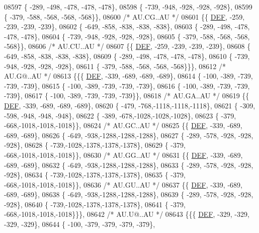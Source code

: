 \begin{DoxyCode}
08597 \{ -289, -498, -478, -478, -478\},
08598 \{ -739, -948, -928, -928, -928\},
08599 \{ -379, -588, -568, -568, -568\}\},
08600 \textcolor{comment}{/* AU.CG..AU */}
08601 \{\{  \mbox{\hyperlink{1_88_84__epars_8h_a397419fc12b37ed479c8abb9d444d843}{DEF}}, -259, -239, -239, -239\},
08602 \{ -649, -858, -838, -838, -838\},
08603 \{ -289, -498, -478, -478, -478\},
08604 \{ -739, -948, -928, -928, -928\},
08605 \{ -379, -588, -568, -568, -568\}\},
08606 \textcolor{comment}{/* AU.CU..AU */}
08607 \{\{  \mbox{\hyperlink{1_88_84__epars_8h_a397419fc12b37ed479c8abb9d444d843}{DEF}}, -259, -239, -239, -239\},
08608 \{ -649, -858, -838, -838, -838\},
08609 \{ -289, -498, -478, -478, -478\},
08610 \{ -739, -948, -928, -928, -928\},
08611 \{ -379, -588, -568, -568, -568\}\}\},
08612 \textcolor{comment}{/* AU.G@..AU */}
08613 \{\{\{  \mbox{\hyperlink{1_88_84__epars_8h_a397419fc12b37ed479c8abb9d444d843}{DEF}}, -339, -689, -689, -689\},
08614 \{ -100, -389, -739, -739, -739\},
08615 \{ -100, -389, -739, -739, -739\},
08616 \{ -100, -389, -739, -739, -739\},
08617 \{ -100, -389, -739, -739, -739\}\},
08618 \textcolor{comment}{/* AU.GA..AU */}
08619 \{\{  \mbox{\hyperlink{1_88_84__epars_8h_a397419fc12b37ed479c8abb9d444d843}{DEF}}, -339, -689, -689, -689\},
08620 \{ -479, -768,-1118,-1118,-1118\},
08621 \{ -309, -598, -948, -948, -948\},
08622 \{ -389, -678,-1028,-1028,-1028\},
08623 \{ -379, -668,-1018,-1018,-1018\}\},
08624 \textcolor{comment}{/* AU.GC..AU */}
08625 \{\{  \mbox{\hyperlink{1_88_84__epars_8h_a397419fc12b37ed479c8abb9d444d843}{DEF}}, -339, -689, -689, -689\},
08626 \{ -649, -938,-1288,-1288,-1288\},
08627 \{ -289, -578, -928, -928, -928\},
08628 \{ -739,-1028,-1378,-1378,-1378\},
08629 \{ -379, -668,-1018,-1018,-1018\}\},
08630 \textcolor{comment}{/* AU.GG..AU */}
08631 \{\{  \mbox{\hyperlink{1_88_84__epars_8h_a397419fc12b37ed479c8abb9d444d843}{DEF}}, -339, -689, -689, -689\},
08632 \{ -649, -938,-1288,-1288,-1288\},
08633 \{ -289, -578, -928, -928, -928\},
08634 \{ -739,-1028,-1378,-1378,-1378\},
08635 \{ -379, -668,-1018,-1018,-1018\}\},
08636 \textcolor{comment}{/* AU.GU..AU */}
08637 \{\{  \mbox{\hyperlink{1_88_84__epars_8h_a397419fc12b37ed479c8abb9d444d843}{DEF}}, -339, -689, -689, -689\},
08638 \{ -649, -938,-1288,-1288,-1288\},
08639 \{ -289, -578, -928, -928, -928\},
08640 \{ -739,-1028,-1378,-1378,-1378\},
08641 \{ -379, -668,-1018,-1018,-1018\}\}\},
08642 \textcolor{comment}{/* AU.U@..AU */}
08643 \{\{\{  \mbox{\hyperlink{1_88_84__epars_8h_a397419fc12b37ed479c8abb9d444d843}{DEF}}, -329, -329, -329, -329\},
08644 \{ -100, -379, -379, -379, -379\},

\end{DoxyCode}
